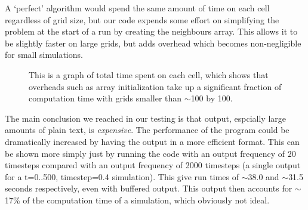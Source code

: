 	 A `perfect' algorithm would spend the same amount of time on each cell regardless of grid size, but our code expends some effort on simplifying the problem 
	 at the start of a run by creating the neighbours array. This allows it to be slightly faster on large grids, but adds overhead which becomes non-negligible 
	 for small simulations.\newline{}
	 
  \begin{figure}[h]
  \begin{center}
  
  \caption{\label{overhead}This is a graph of total time spent on each cell, which shows that overheads such as array initialization
  take up a significant fraction of computation time with grids smaller than $\sim$100 by 100.}
  \end{center}
  \end{figure}
  
	 
   The main conclusion we reached in our testing is that output, espcially large amounts of plain text, is \emph{expensive}. The performance of
   the program could be dramatically increased by having the output in a more efficient format. This can be shown more simply just by running the 
   code with an output frequency of 20 timesteps compared with an output frequency of 2000 timesteps (a single output for a t=0..500, timestep=0.4
   simulation). This give run times of $\sim$38.0 and $\sim$31.5 seconds respectively, even with buffered output. This output then accounts for 
   $\sim$ 17\% of the computation time of a simulation, which obviously not ideal.  \newline{}

